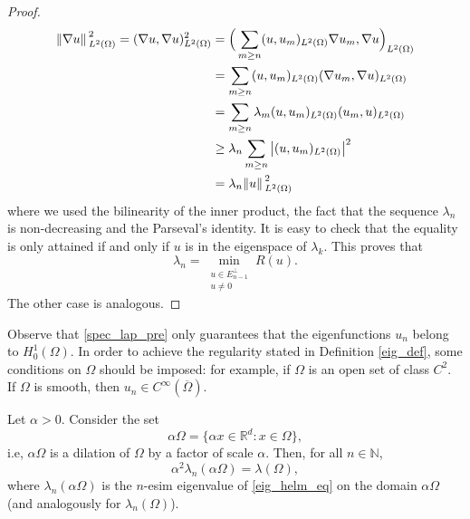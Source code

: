 \begin{proof}
    \begin{align*}
        \norm*{\nabla u}_{L^2(\Omega)}^2 = (\nabla u, \nabla u)_{L^2(\Omega)}^2 &= \Big(\sum_{m\geq n} (u, u_m)_{L^2(\Omega)} \nabla u_m, \nabla u \Big)_{L^2(\Omega)}\\
        &=\sum_{m\geq n} (u, u_m)_{L^2(\Omega)} (\nabla u_m, \nabla u)_{L^2(\Omega)}\\
        &=\sum_{m\geq n} \lambda_m (u, u_m)_{L^2(\Omega)} (u_m, u)_{L^2(\Omega)}\\
        & \geq \lambda_n \sum_{m\geq n} \abs{(u, u_m)_{L^2(\Omega)}}^2\\
        &= \lambda_n \norm*{u}_{L^2(\Omega)}^2
    \end{align*}
    where we used the bilinearity of the inner product, the fact that the sequence \(\lambda_n\) is non-decreasing and the Parseval's identity. It is easy to check that the equality is only attained if and only if \(u\) is in the eigenspace of \(\lambda_k\). This proves that
    \[
        \lambda_n = \min_{\substack{u \in E^\perp_{n-1} \\ u \neq 0}} R(u). 
    \]
    The other case is analogous.
\end{proof}
\begin{remark}
    Observe that \eqref{spec_lap_pre} only guarantees that the eigenfunctions \(u_n\) belong to \(H^1_0(\Omega)\). In order to achieve the regularity stated in Definition \eqref{eig_def}, some conditions on \(\Omega\) should be imposed: for example, if \(\Omega\) is an open set of class \(C^2\). If \(\Omega\) is smooth, then \(u_n \in C^\infty(\overline{\Omega})\).
\end{remark}

\begin{corollary}[Homogeneity]\label{lap_homo}
    Let \(\alpha > 0\). Consider the set
    \[
        \alpha \Omega = \{\alpha x \in \mathbb{R}^d: x \in \Omega\},
    \]
    i.e, \(\alpha \Omega\) is a dilation of \(\Omega\) by a factor of scale \(\alpha\).  
    Then, for all \(n \in \mathbb{N}\),
    \[
        \alpha^2 \lambda_n(\alpha \Omega) = \lambda(\Omega),
    \]
    where \(\lambda_n(\alpha \Omega)\) is the \(n\)-esim eigenvalue of \eqref{eig_helm_eq} on the domain \(\alpha \Omega\) (and analogously for \(\lambda_n(\Omega)\)).
\end{corollary}

